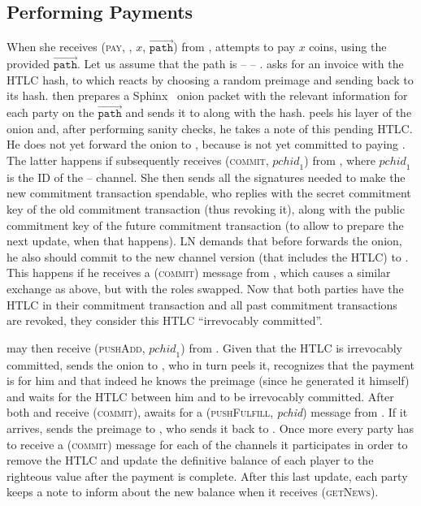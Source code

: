   \subsection{Performing Payments}
    When she receives (\textsc{pay}, \charlie, $x$,
    $\overrightarrow{\mathtt{path}}$) from \environment, \alice{} attempts to
    pay \charlie{} $x$ coins, using the provided
    $\overrightarrow{\mathtt{path}}$. Let us assume that the path is \alice{} --
    \bob{} -- \charlie. \alice{} asks \charlie{} for an invoice with the HTLC
    hash, to which \charlie{} reacts by choosing a random preimage and sending
    back to \alice{} its hash. \alice{} then prepares a Sphinx~\cite{sphinx}
    onion packet with the relevant information for each party on the
    $\overrightarrow{\mathtt{path}}$ and sends it to \bob{} along with the hash.
    \bob{} peels his layer of the onion and, after performing sanity checks, he
    takes a note of this pending HTLC. He does not yet forward the onion to
    \charlie, because \alice{} is not yet committed to paying \bob. The latter
    happens if \alice{} subsequently receives (\textsc{commit},
    $\mathit{pchid}_1$) from \environment, where $\mathit{pchid}_1$ is the ID of
    the \alice{} -- \bob{} channel. She then sends \bob{} all the signatures
    needed to make the new commitment transaction spendable, who replies with
    the secret commitment key of the old commitment transaction (thus revoking
    it), along with the public commitment key of the future commitment
    transaction (to allow \alice{} to prepare the next update, when that
    happens). LN demands that before \bob{} forwards the onion, he also should
    commit to the new channel version (that includes the HTLC) to \alice. This
    happens if he receives a (\textsc{commit}) message from \environment, which
    causes a similar exchange as above, but with the roles swapped. Now that
    both parties have the HTLC in their commitment transaction and all past
    commitment transactions are revoked, they consider this HTLC ``irrevocably
    committed''.

    \bob{} may then receive (\textsc{pushAdd}, $\mathit{pchid}_1$) from
    \environment. Given that the HTLC is irrevocably committed, \bob{} sends the
    onion to \charlie, who in turn peels it, recognizes that the payment is for
    him and that indeed he knows the preimage (since he generated it himself)
    and waits for the HTLC between him and \bob{} to be irrevocably committed.
    After both \bob{} and \charlie{} receive (\textsc{commit}), \charlie{}
    awaits for a (\textsc{pushFulfill}, \textit{pchid}) message from
    \environment. If it arrives, \charlie{} sends the preimage to \bob, who
    sends it back to \alice. Once more every party has to receive a
    (\textsc{commit}) message for each of the channels it participates in order
    to remove the HTLC and update the definitive balance of each player to the
    righteous value after the payment is complete. After this last update, each
    party keeps a note to inform \environment{} about the new balance when it
    receives (\textsc{getNews}).

